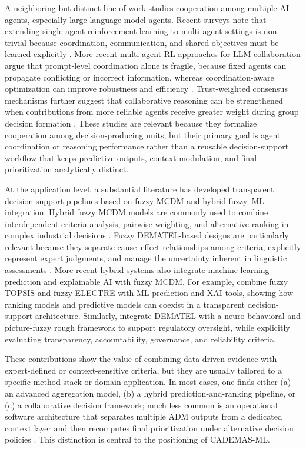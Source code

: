 A neighboring but distinct line of work studies cooperation among multiple AI agents, especially large-language-model agents. Recent surveys note that extending single-agent reinforcement learning to multi-agent settings is non-trivial because coordination, communication, and shared objectives must be learned explicitly \citep{Sun2024MARL}. More recent multi-agent RL approaches for LLM collaboration argue that prompt-level coordination alone is fragile, because fixed agents can propagate conflicting or incorrect information, whereas coordination-aware optimization can improve robustness and efficiency \citep{Liu2025CoMLRL}. Trust-weighted consensus mechanisms further suggest that collaborative reasoning can be strengthened when contributions from more reliable agents receive greater weight during group decision formation \citep{Shakya2026Trust}. These studies are relevant because they formalize cooperation among decision-producing units, but their primary goal is agent coordination or reasoning performance rather than a reusable decision-support workflow that keeps predictive outputs, context modulation, and final prioritization analytically distinct.

At the application level, a substantial literature has developed transparent decision-support pipelines based on fuzzy MCDM and hybrid fuzzy--ML integration. Hybrid fuzzy MCDM models are commonly used to combine interdependent criteria analysis, pairwise weighting, and alternative ranking in complex industrial decisions \citep{Abdulgader2018Fuzzy}. Fuzzy DEMATEL-based designs are particularly relevant because they separate cause--effect relationships among criteria, explicitly represent expert judgments, and manage the uncertainty inherent in linguistic assessments \citep{Sahraei2022Flood}. More recent hybrid systems also integrate machine learning prediction and explainable AI with fuzzy MCDM. For example, \citet{Ozkurt2025Energy} combine fuzzy TOPSIS and fuzzy ELECTRE with ML prediction and XAI tools, showing how ranking models and predictive models can coexist in a transparent decision-support architecture. Similarly, \citet{Mikhaylov2026Energy} integrate DEMATEL with a neuro-behavioral and picture-fuzzy rough framework to support regulatory oversight, while explicitly evaluating transparency, accountability, governance, and reliability criteria.

These contributions show the value of combining data-driven evidence with expert-defined or context-sensitive criteria, but they are usually tailored to a specific method stack or domain application. In most cases, one finds either (a) an advanced aggregation model, (b) a hybrid prediction-and-ranking pipeline, or (c) a collaborative decision framework; much less common is an operational software architecture that separates multiple ADM outputs from a dedicated context layer and then recomputes final prioritization under alternative decision policies \citep{Tariq2024A2C,Abdulgader2018Fuzzy,Ozkurt2025Energy}. This distinction is central to the positioning of CADEMAS-ML.

